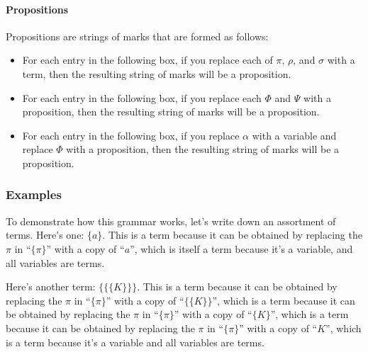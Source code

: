 \documentclass[12pt]{article}
\newcommand{\injrightarrow}{\xrightarrow{\text{inj}}}
\newcommand{\surjrightarrow}{\xrightarrow{\text{surj}}}
\newcommand{\bijrightarrow}{\xrightarrow{\text{bij}}}
\newcommand{\AND}{\wedge}
\newcommand{\OR}{\vee}
\begin{document}
\paragraph{Propositions}
Propositions are strings of marks that are formed as follows:
\begin{itemize}
\item
For each entry in the following box,
if you replace each of $\pi$, $\rho$, and $\sigma$ with a term, then
the resulting string of marks will be a proposition.
\begin{center}
\fbox{
\parbox{30em}{
$(\pi\in\rho)$ \sp
$(\pi\notin\rho)$ \sp
$(\pi=\rho)$ \sp
$(\pi\neq\rho)$ \sp
$(\pi\subseteq\rho)$ \sp
$(\pi:\rho\rightarrow\sigma)$ \sp
$(\pi:\rho\injrightarrow\sigma)$ \sp
$(\pi:\rho\surjrightarrow\sigma)$ \sp
$(\pi:\rho\bijrightarrow\sigma)$ \sp
}
}
\end{center}
\item
For each entry in the following box,
if you replace each $\Phi$ and $\Psi$ with a proposition, then
the resulting string of marks will be a proposition.
\begin{center}
\fbox{
$(\neg\Phi)$ \sp
$(\Phi\AND\Psi)$ \sp
$(\Phi\OR\Psi)$ \sp
$(\Phi\Longrightarrow\Psi)$ \sp
$(\Phi\Longleftrightarrow\Psi)$ \sp
}
\end{center}
\item
For each entry in the following box,
if you replace $\alpha$ with a variable and replace $\Phi$ with a proposition, then
the resulting string of marks will be a proposition.
\begin{center}
\fbox{
$(\forall \alpha\, |\, \Phi)$ \sp
$(\exists \alpha\, |\, \Phi)$ 
}
\end{center}
\end{itemize}

\subsubsection{Examples}

\def\sp{\hspace{1em}}
To demonstrate how this grammar works, let's write down an assortment of terms. Here's one:
$\{a\}.$
This is a term because it can be obtained 
by replacing the $\pi$ in ``$\{\pi\}$'' with a copy of ``$a$'', which is itself a term because
it's a variable, and all variables are terms.

Here's another term: $\{\{\{K\}\}\}$. This is a term because
it can be obtained by replacing the $\pi$ in ``$\{\pi\}$'' with a copy of ``$\{\{K\}\}$'',
which is a term because
it can be obtained by replacing the $\pi$ in ``$\{\pi\}$'' with a copy of ``$\{K\}$'',
which is a term because
it can be obtained by replacing the $\pi$ in ``$\{\pi\}$'' with a copy of ``$K$'',
which is a term because
it's a variable and all variables are terms.
\end{document}
